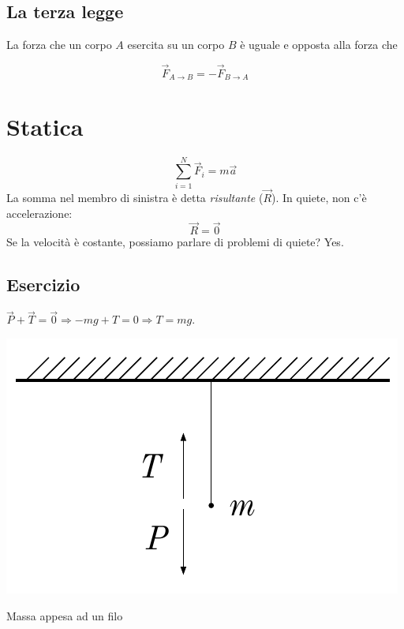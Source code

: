 \subsection{La terza legge}
\vspace{8pt}
\begin{tcolorbox}[colback = red!30, colframe = red!30!black, title = {Terza legge della dinamica (legge di azione e reazione)}]
La forza che un corpo $A$ esercita su un corpo $B$ è uguale e opposta alla forza
che

\[ \overrightarrow{F}_{A\to B} = -\overrightarrow{F}_{B\to A} \]
\end{tcolorbox}
\vspace{5pt}


\section{Statica}
\[ \sum_{i = 1}^{N}\overrightarrow{F}_i = m\overrightarrow{a} \]
La somma nel membro di sinistra è detta \textit{risultante} ($\overrightarrow{R}$).
In quiete, non c'è accelerazione:
\[ \overrightarrow{R} = \overrightarrow{0} \]
Se la velocità è costante, possiamo parlare di problemi di quiete? Yes.

\subsection*{Esercizio}
$\overrightarrow{P} + \overrightarrow{T} = \overrightarrow{0} \Rightarrow -mg + T = 0 \Rightarrow T = mg$.

\begin{marginfigure}
    \centering
    \includegraphics[width = \marginparwidth]{figures/statica.pdf}
    \caption{Massa appesa ad un filo}
    \label{filo}
\end{marginfigure}

